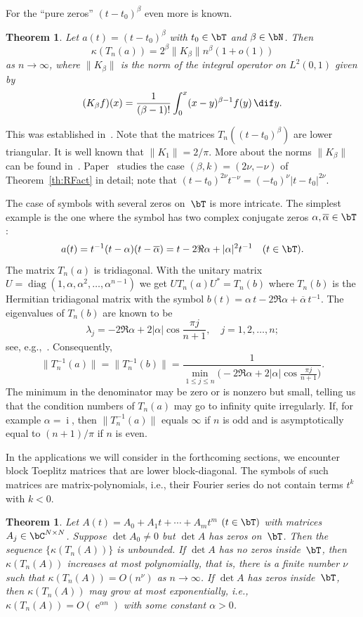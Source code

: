 \documentclass[addpoints,12pt,letter]{article}
\DeclareMathOperator{\diag}{diag}
\DeclareMathOperator{\e}{e}
\DeclareMathOperator{\mi}{i} %
\newcommand{\al}{\alpha}
\newcommand{\be}{\beta}
\newcommand{\ka}{\kappa}
\newcommand{\la}{\lambda}
\newcommand{\nf}{\infty}
\newcommand{\ol}{\overline}
\renewcommand{\d}{\dif}
\renewcommand{\le}{\leqslant}
\numberwithin{equation}{section}
\newtheorem{theorem}[lemma]{Theorem}
\theoremstyle{definition}
\begin{document}
For the ``pure zeros'' $(t-t_{0})^\be$ even more is known.

\begin{theorem}\label{th:pure}
Let $a(t)=(t-t_{0})^\be$ with $t_{0}\in\bT$ and $\be\in\bN$.
Then
\[
\ka(T_{n}(a))=2^\be\|K_\be\|n^\be (1+o(1))
\]
as $n\to\nf$, where $\|K_\be\|$ is the norm of the integral operator on $L^{2}(0,1)$ given by
\[
(K_\be f)(x)=\frac{1}{(\be-1)!}\int_{0}^{x} (x-y)^{\be-1}f(y)\,\d y.
\]
\end{theorem}

This was established in~\cite{BoDo09}.
Note that the matrices $T_{n}((t-t_{0})^\be)$ are lower triangular.
It is well known that $\|K_{1}\|=2/\pi$.
More about the norms $\|K_\be\|$ can be found in~\cite{BoDo09}.
Paper~\cite{BoWi06} studies the case $(\be,k)=(2\nu,-\nu)$ of Theorem~\ref{th:RFact} in detail;
note that $(t-t_{0})^{2\nu}t^{-\nu}=(-t_{0})^\nu|t-t_{0}|^{2\nu}$.

The case of symbols with several zeros on~$\bT$ is more intricate.
The simplest example is the one where the symbol has two complex conjugate zeros $\al, \ol{\al}\in\bT$:
\[
a(t)=t^{-1}(t-\al)(t-\ol{\al})=t-2\Re\al+|\al|^{2} t^{-1}\quad(t\in\bT).
\]
The matrix $T_{n}(a)$ is tridiagonal.
With the unitary matrix $U=\diag(1,\al, \al^{2}, \ldots, \al^{n-1})$ we get $UT_{n}(a)U^{\ast}=T_{n}(b)$ where $T_{n}(b)$ is the Hermitian tridiagonal matrix with the symbol $b(t)=\al\, t-2\Re\al+\ol{\al}\, t^{-1}$.
The eigenvalues of $T_{n}(b)$ are known to be
\[
\la_{j}=-2\Re\al+2|\al|\cos\frac{\pi j}{n+1}, \quad j=1,2, \ldots,n;
\]
see, e.g.,~\cite[Theorem 2.4]{BoGr05}.
Consequently,
\[
\|T_{n}^{-1}(a)\|=\|T_{n}^{-1}(b)\|=\frac{1}{\min_{1\le j\le n}\big(-2\Re\al+2|\al|\cos\frac{\pi j}{n+1}\big)}.
\]
The minimum in the denominator may be zero or is nonzero but small, telling us that the condition numbers of $T_{n}(a)$ may go to infinity quite irregularly.
If, for example $\al=\mi$, then $\|T_{n}^{-1}(a)\|$ equals $\nf$ if $n$ is odd and is asymptotically equal to $(n+1)/\pi$ if $n$ is even.

In the applications we will consider in the forthcoming sections, we encounter block Toeplitz matrices that are lower block-diagonal.
The symbols of such matrices are matrix-polynomials, i.e., their Fourier series do not contain terms $t^{k}$ with $k<0$.

\begin{theorem}\label{th:mapol}
Let $A(t)=A_{0}+A_{1}t +\cdots+A_{m}t^{m}$ $(t\in\bT)$ with matrices $A_{j}\in\bC^{N \times N}$.
Suppose $\det A_{0} \ne 0$ but $\det A$ has zeros on~$\bT$.
Then the sequence $\{\ka(T_{n}(A))\}$ is unbounded.
If $\det A$ has no zeros inside~$\bT$, then $\ka(T_{n}(A))$ increases at most polynomially, that is, there is a finite number $\nu$ such that $\ka(T_{n}(A))=O(n^\nu)$ as $n\to\nf$.
If $\det A$ has zeros inside~$\bT$, then $\ka(T_{n}(A))$ may grow at most exponentially, i.e., $\ka(T_{n}(A))=O(\e^{\al n})$ with some constant $\al>0$.
\end{theorem}
\end{document}
